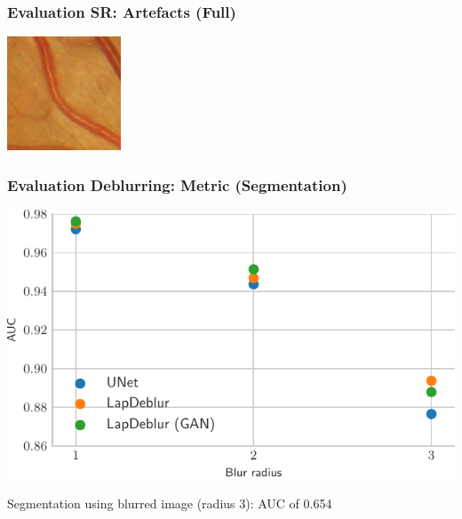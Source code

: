 \documentclass{beamer}
\begin{document}
\begin{frame} \frametitle{Evaluation SR: Artefacts (Full) }
  \centering
\includegraphics[width=0.7\linewidth]{patch_sr1_gan_small}
\end{frame}


\begin{frame} \frametitle{Evaluation Deblurring: Metric (Segmentation)}
  \includegraphics{deblur_auc_beamer}

  Segmentation using blurred image (radius 3): AUC of 0.654
\end{frame}
\end{document}
